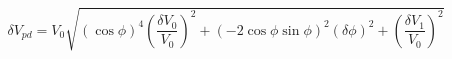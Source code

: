 \begin{equation}
\label{eq:delta_V_Malus}
\delta V_{pd} = {V_0}\sqrt{ {\left(\cos{\phi}\right)}^4\left(\frac{\delta V_0}{V_0}\right)^2 + \left(-2 \cos{\phi}\sin{\phi} \right)^2(\delta \phi)^2+ \left(\frac{\delta V_1}{V_0}\right)^2}
\end{equation}